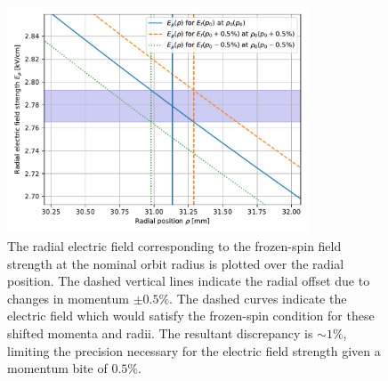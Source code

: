 \begin{refsection}
        \begin{figure}
            \centering
            \includegraphics[width=0.8\textwidth]{Figures/muEDM/Electrode/ElectricField.pdf}
            \caption[muEDM: study of the radial electric field]{The radial electric field corresponding to the frozen-spin field strength at the nominal orbit radius is plotted over the radial position. The dashed vertical lines indicate the radial offset due to changes in momentum $\pm0.5\%$. The dashed curves indicate the electric field which would satisfy the frozen-spin condition for these shifted momenta and radii. The resultant discrepancy is $\sim1\%$, limiting the precision necessary for the electric field strength given a momentum bite of $0.5\%$.}
            \label{fig:efieldprecision}
        \end{figure}
        

\end{refsection}
